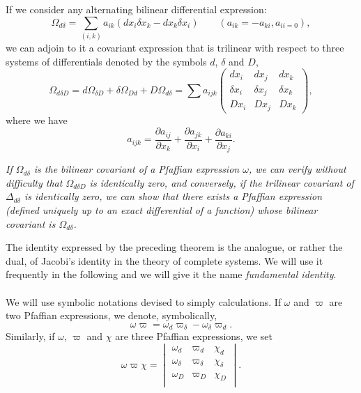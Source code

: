 \documentclass[leqno,11pt]{book}
\newcommand{\pd}{\partial}
\theoremstyle{shape1}
\theoremstyle{shapesmall}
\newcommand{\vp}{\varpi}
\newcommand{\somespace}{\vspace{9pt}}
\begin{document}
If we consider any alternating bilinear differential expression:
\begin{equation}
  \label{eq:p3}
  \Omega_{d\delta}=\sum_{(i,k)}a_{ik}(dx_{i}\delta x_{k}-dx_{k}\delta x_{i})\qquad (a_{ik}=-a_{ki},a_{ii=0}),
\end{equation}
we can adjoin to it a covariant expression that is trilinear with respect to three systems of differentials denoted by the symbols $d$, $\delta$ and $D$,
\begin{equation}
  \label{eq:p4}
  \Omega_{d\delta D}=d\Omega_{\delta D}+\delta\Omega_{Dd}+D\Omega_{d\delta}=\sum{a_{ijk}}
  \begin{pmatrix}
    dx_{i}&dx_{j}&dx_{k}\\
    \delta x_{i}&\delta x_{j}&\delta x_{k}\\
    Dx_{i}&Dx_{j}&Dx_{k}
  \end{pmatrix},
\end{equation}
where we have
\[
a_{ijk}=\frac{\pd a_{ij}}{\pd x_{k}}+\frac{\pd a_{jk}}{\pd x_{i}}+\frac{\pd a_{ki}}{\pd x_{j}}.
\]

\somespace

\emph{If $\Omega_{d\delta}$ is the bilinear covariant of a Pfaffian expression $\omega$, we can verify without difficulty that $\Omega_{d\delta D}$ is identically zero, and conversely, if the trilinear covariant of $\Delta_{d\delta}$ is identically zero, we can show that there exists a Pfaffian expression (defined uniquely up to an exact differential of a function) whose bilinear covariant is $\Omega_{d\delta}$.}

\somespace

The identity expressed by the preceding theorem is the analogue, or rather the dual, of Jacobi's identity in the theory of complete systems. We will use it frequently in the following and we will give it the name \emph{fundamental identity}.

\paragraph{}
\label{sec:p2}
We will use symbolic notations devised to simply calculations. If $\omega$ and $\vp$ are two Pfaffian expressions, we denote, symbolically,
\begin{equation}
  \label{eq:p5}
  \omega\vp=\omega_{d}\vp_{\delta}-\omega_{\delta}\vp_{d}.
\end{equation}
Similarly, if $\omega$, $\vp$ and $\chi$ are three Pfaffian expressions, we set
\begin{equation}
  \label{eq:p6}
  \omega\vp\chi=
  \begin{vmatrix}
    \omega_{d}&\vp_{d}&\chi_{d}\\
    \omega_{\delta}&\vp_{\delta}&\chi_{\delta}\\
    \omega_{D}&\vp_{D}&\chi_{D}\\
  \end{vmatrix}.
\end{equation}
\end{document}
